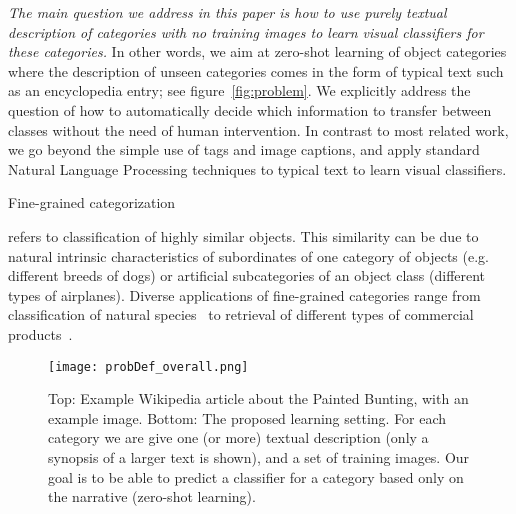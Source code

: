 {\em The main question we address in this paper is how to use purely textual description of categories with no training images to learn visual classifiers for these categories.} In other words, we aim at zero-shot learning of object categories where the description of unseen categories comes in the form of typical text such as an encyclopedia entry; see figure~\ref{fig:problem}. We explicitly address the question of how to automatically decide which information to transfer between classes without the need of human intervention.  In contrast to most related work, we go beyond the simple use of tags and image captions, and apply standard Natural Language Processing techniques to typical text to learn visual classifiers. 


Fine-grained categorization  refers to classification of highly similar objects. This similarity can be due to natural intrinsic characteristics of subordinates of one category of objects (e.g. different breeds of dogs) or artificial subcategories of an object class (different types of airplanes). Diverse applications of fine-grained categories range from classification of natural species~\cite{wah2011caltech,Flower08,wang2009learning,liu2012dog} to retrieval of different types of commercial products~\cite{maji2013fine}. 
\begin{figure*}[t]
\centering

\texttt{[image: probDef\_overall.png]}
\caption{ Top: Example Wikipedia article about the Painted Bunting, with an example image. Bottom: The proposed learning setting. For each category we are give one (or more) textual description (only a synopsis of a larger text is shown),  and a set of training images. Our goal is to be able to predict a classifier for a  category based only on the narrative (zero-shot learning). }
\label{F:prob_def}
\vspace{-14pt}
\end{figure*}
